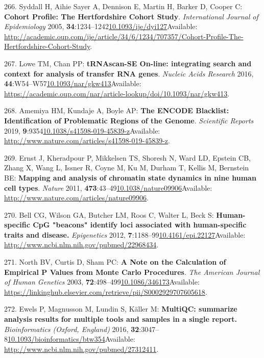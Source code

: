 \documentclass[
]{book}
\begin{document}
\leavevmode\hypertarget{ref-Syddall2005}{}%
266. Syddall H, Aihie Sayer A, Dennison E, Martin H, Barker D, Cooper C: \textbf{Cohort Profile: The Hertfordshire Cohort Study}. \emph{International Journal of Epidemiology} 2005, \textbf{34}:1234--1242\href{https://doi.org/10.1093/ije/dyi127}{10.1093/ije/dyi127}Available: \url{http://academic.oup.com/ije/article/34/6/1234/707357/Cohort-Profile-The-Hertfordshire-Cohort-Study}.

\leavevmode\hypertarget{ref-Lowe2016}{}%
267. Lowe TM, Chan PP: \textbf{tRNAscan-SE On-line: integrating search and context for analysis of transfer RNA genes}. \emph{Nucleic Acids Research} 2016, \textbf{44}:W54--W57\href{https://doi.org/10.1093/nar/gkw413}{10.1093/nar/gkw413}Available: \url{https://academic.oup.com/nar/article-lookup/doi/10.1093/nar/gkw413}.

\leavevmode\hypertarget{ref-Amemiya2019}{}%
268. Amemiya HM, Kundaje A, Boyle AP: \textbf{The ENCODE Blacklist: Identification of Problematic Regions of the Genome}. \emph{Scientific Reports} 2019, \textbf{9}:9354\href{https://doi.org/10.1038/s41598-019-45839-z}{10.1038/s41598-019-45839-z}Available: \url{http://www.nature.com/articles/s41598-019-45839-z}.

\leavevmode\hypertarget{ref-Ernst2011}{}%
269. Ernst J, Kheradpour P, Mikkelsen TS, Shoresh N, Ward LD, Epstein CB, Zhang X, Wang L, Issner R, Coyne M, Ku M, Durham T, Kellis M, Bernstein BE: \textbf{Mapping and analysis of chromatin state dynamics in nine human cell types}. \emph{Nature} 2011, \textbf{473}:43--49\href{https://doi.org/10.1038/nature09906}{10.1038/nature09906}Available: \url{http://www.nature.com/articles/nature09906}.

\leavevmode\hypertarget{ref-Bell2012a}{}%
270. Bell CG, Wilson GA, Butcher LM, Roos C, Walter L, Beck S: \textbf{Human-specific CpG "beacons" identify loci associated with human-specific traits and disease.} \emph{Epigenetics} 2012, \textbf{7}:1188--99\href{https://doi.org/10.4161/epi.22127}{10.4161/epi.22127}Available: \url{http://www.ncbi.nlm.nih.gov/pubmed/22968434}.

\leavevmode\hypertarget{ref-North2003}{}%
271. North BV, Curtis D, Sham PC: \textbf{A Note on the Calculation of Empirical P Values from Monte Carlo Procedures}. \emph{The American Journal of Human Genetics} 2003, \textbf{72}:498--499\href{https://doi.org/10.1086/346173}{10.1086/346173}Available: \url{https://linkinghub.elsevier.com/retrieve/pii/S0002929707605618}.

\leavevmode\hypertarget{ref-Ewels2016}{}%
272. Ewels P, Magnusson M, Lundin S, Käller M: \textbf{MultiQC: summarize analysis results for multiple tools and samples in a single report.} \emph{Bioinformatics (Oxford, England)} 2016, \textbf{32}:3047--8\href{https://doi.org/10.1093/bioinformatics/btw354}{10.1093/bioinformatics/btw354}Available: \url{http://www.ncbi.nlm.nih.gov/pubmed/27312411}.
\end{document}
